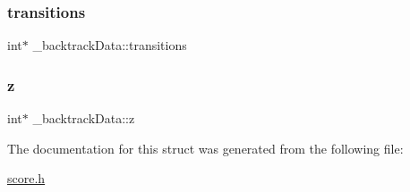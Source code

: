 \mbox{\label{struct__backtrackData_ac559f1f5976ad99432828f9f9ea7f218}} 
\subsubsection{\texorpdfstring{transitions}{transitions}}
{\footnotesize\ttfamily int$\ast$ \+\_\+backtrack\+Data\+::transitions}

\mbox{\label{struct__backtrackData_a72e1450e2610bee1d867d8428f33a2cc}} 
\subsubsection{\texorpdfstring{z}{z}}
{\footnotesize\ttfamily int$\ast$ \+\_\+backtrack\+Data\+::z}



The documentation for this struct was generated from the following file\+:\begin{DoxyCompactItemize}
\item 
\hyperlink{score_8h}{score.\+h}\end{DoxyCompactItemize}
